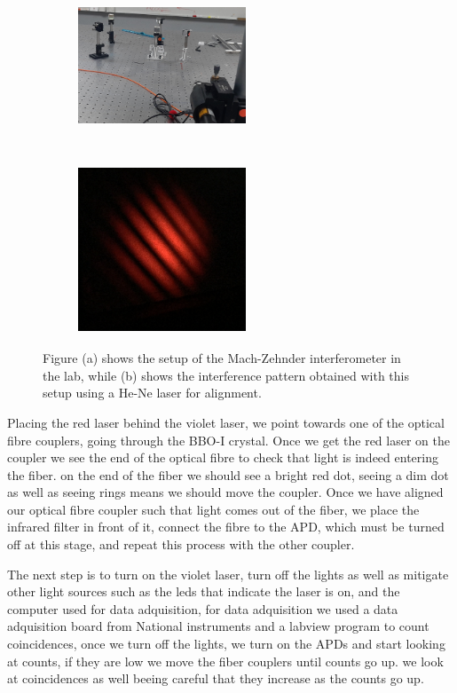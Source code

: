 \documentclass[12pt]{book}
\begin{document}
\begin{figure}[t!]
\centering
\begin{subfigure}[b]{0.48\linewidth}
\includegraphics[width=5cm,height=5cm]{images/array1.jpg}
\caption{}
\end{subfigure}
\begin{subfigure}[b]{0.48\linewidth}
\includegraphics[width=5cm,height=5cm]{images/interference.jpg}
\caption{}
\end{subfigure}
\caption{Figure (a) shows the setup of the Mach-Zehnder interferometer in the lab, while (b) shows the interference pattern obtained with this setup using a He-Ne laser for alignment.}
\label{fig:Mach-Clasico}
\end{figure}





Placing the red laser behind the violet laser, we point towards one of the optical fibre couplers, going through the BBO-I crystal. Once we get the red laser on the coupler we see the end of the optical fibre to check that light is indeed entering the fiber. on the end of the fiber we should see a bright red dot, seeing a dim dot as well as seeing rings means we should move the coupler. Once we have aligned our optical fibre coupler such that light comes out of the fiber, we place the infrared filter in front of it, connect the fibre to the APD, which must be turned off at this stage, and repeat this process with the other coupler.

The next step is to turn on the violet laser, turn off the lights as well as mitigate other light sources such as the leds that indicate the laser is on, and the computer used for data adquisition, for data adquisition we used a data adquisition board from National instruments and a labview program to count coincidences, once we turn off the lights, we turn on the APDs and start looking at counts, if they are low we move the fiber couplers until counts go up. we look at coincidences as well beeing careful that they increase as the counts go up.
\end{document}

